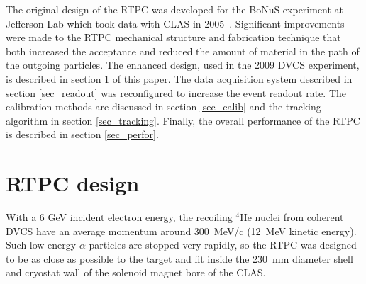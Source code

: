 \documentclass[preprint,5p]{elsarticle}
\begin{document}
The original design of the RTPC was developed for the BoNuS 
experiment at Jefferson Lab which took data with CLAS in 
2005~\cite{Fenker:2008zz}. Significant improvements were made to the RTPC mechanical 
structure and fabrication technique that both increased the acceptance and 
reduced the amount of material in the path of the outgoing particles. The enhanced design, 
used in the 2009 DVCS experiment, is described in section \ref{sec_design} of 
this paper. The data acquisition system described in section \ref{sec_readout} 
was reconfigured to increase the event readout rate. The calibration methods 
are discussed in section \ref{sec_calib} and the tracking algorithm in section
\ref{sec_tracking}. Finally, the overall performance
of the RTPC is described in section \ref{sec_perfor}.

\section{RTPC design} \label{sec_design}

With a 6 GeV incident electron energy, the recoiling $^{4}$He nuclei from 
coherent DVCS have an average momentum around 300~MeV/c (12~MeV kinetic 
energy). Such low energy $\alpha$ particles are stopped very rapidly, so the 
RTPC was designed to be as close as possible to the target and fit inside the 
230~mm diameter shell and cryostat wall of the solenoid magnet bore of the 
CLAS.
\end{document}
